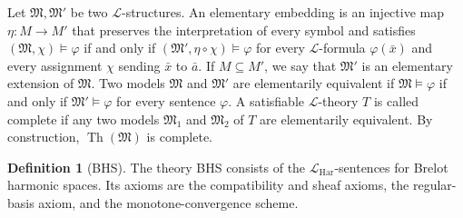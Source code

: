 \documentclass{amsart}
\theoremstyle{definition}
\newtheorem{definition}{Definition}[section]
\theoremstyle{remark}
\newtheorem{remark}[definition]{Remark}
\numberwithin{equation}{section}
\begin{document}
	Let $\mathfrak M,\mathfrak M'$ be two $\mathcal L$-structures. An elementary embedding is an injective map $\eta:M\to M'$ that preserves the interpretation of every symbol and satisfies $(\mathfrak M,\chi)\models\varphi$ if and only if $(\mathfrak M',\eta\circ\chi)\models\varphi$ for every $\mathcal L$-formula $\varphi(\bar x)$ and every assignment $\chi$ sending $\bar x$ to $\bar a$. If $M\subseteq M'$, we say that $\mathfrak M'$ is an elementary extension of $\mathfrak M$. Two models $\mathfrak M$ and $\mathfrak M'$ are elementarily equivalent if $\mathfrak M\models\varphi$ if and only if $\mathfrak M'\models\varphi$ for every sentence $\varphi$.
	A satisfiable $\mathcal L$-theory $T$ is called complete if any two models $\mathfrak M_1$ and $\mathfrak M_2$ of $T$ are elementarily equivalent. By construction, $\operatorname{Th}(\mathfrak M)$ is complete.
	
	
	
	\begin{definition}[BHS] The theory BHS consists of the $\mathcal L_{\mathrm{Har}}$-sentences for Brelot harmonic spaces. Its axioms are the compatibility and sheaf axioms, the regular-basis axiom, and the monotone-convergence scheme.
\end{definition} 

\end{document}
